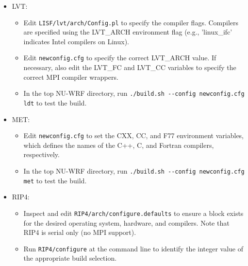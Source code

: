 \begin{itemize}
\begin{itemize}
  \item In the top NU-WRF directory, run 
    \texttt{./build.sh -\--config \mbox{newconfig.cfg} ldt} to test the 
    build.

  \end{itemize}

\item LVT:
  \begin{itemize}

  \item Edit \texttt{LISF/lvt/arch/Config.pl} to specify the compiler flags. 
    Compilers are specified using the LVT\_ARCH environment flag (e.g.,
    'linux\_ifc' indicates Intel compilers on Linux).

  \item Edit \texttt{newconfig.cfg} to specify the correct LVT\_ARCH value.
    If necessary, also edit the LVT\_FC and LVT\_CC variables to specify the
    correct MPI compiler wrappers.

  \item In the top NU-WRF directory, run 
    \texttt{./build.sh -\--config \mbox{newconfig.cfg} ldt} to test the build.

  \end{itemize}

\item MET:
  \begin{itemize}

  \item Edit \texttt{newconfig.cfg} to set the CXX, CC, and F77 environment
    variables, which defines the names of the C++, C, and Fortran compilers,
    respectively.

  \item In the top NU-WRF directory, run 
    \texttt{./build.sh -\--config \mbox{newconfig.cfg} met} to test the 
    build.

  \end{itemize}

\item RIP4:
  \begin{itemize}

  \item Inspect and edit \texttt{RIP4/arch/configure.defaults} to ensure a 
    block exists for the desired operating system, hardware, and 
    compilers. Note that RIP4 is serial only (no MPI support).

  \item Run \texttt{RIP4/configure} at the command line to identify the 
    integer value of the appropriate build selection.


\end{itemize}
\end{itemize}
